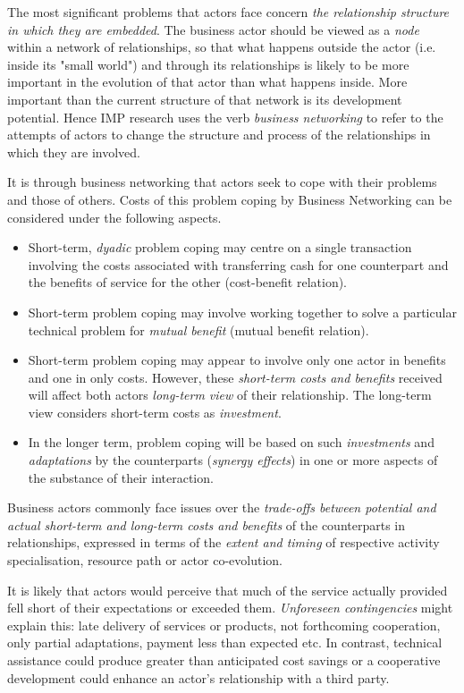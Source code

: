 \documentclass[11pt,a4paper]{article}
\begin{document}
The most signiﬁcant problems that actors face concern \emph{the relationship
  structure in which they are embedded}. The business actor should be viewed
as a \emph{node} within a network of relationships, so that what happens
outside the actor (i.e. inside its "small world") and through its
relationships is likely to be more important in the evolution of that actor
than what happens inside.  More important than the current structure of that
network is its development potential.  Hence IMP research uses the verb
\emph{business networking} to refer to the attempts of actors to change the
structure and process of the relationships in which they are involved.

It is through business networking that actors seek to cope with their problems
and those of others.  Costs of this problem coping by Business Networking can
be considered under the following aspects.
\begin{itemize}
\item Short-term, \emph{dyadic} problem coping may centre on a single
  transaction involving the costs associated with transferring cash for one
  counterpart and the beneﬁts of service for the other (cost-benefit
  relation).
\item Short-term problem coping may involve working together to solve a
  particular technical problem for \emph{mutual beneﬁt} (mutual benefit
  relation).
\item Short-term problem coping may appear to involve only one actor in
  beneﬁts and one in only costs. However, these \emph{short-term costs and
    beneﬁts} received will affect both actors \emph{long-term view} of their
  relationship.  The long-term view considers short-term costs as
  \emph{investment}.
\item In the longer term, problem coping will be based on such
  \emph{investments} and \emph{adaptations} by the counterparts (\emph{synergy
    effects}) in one or more aspects of the substance of their interaction.
\end{itemize}
Business actors commonly face issues over the \emph{trade-offs between
  potential and actual short-term and long-term costs and beneﬁts} of the
counterparts in relationships, expressed in terms of the \emph{extent and
  timing} of respective activity specialisation, resource path or actor
co-evolution.

It is likely that actors would perceive that much of the service actually
provided fell short of their expectations or exceeded them.  \emph{Unforeseen
  contingencies} might explain this: late delivery of services or products,
not forthcoming cooperation, only partial adaptations, payment less than
expected etc. In contrast, technical assistance could produce greater than
anticipated cost savings or a cooperative development could enhance an actor's
relationship with a third party.
\end{document}
